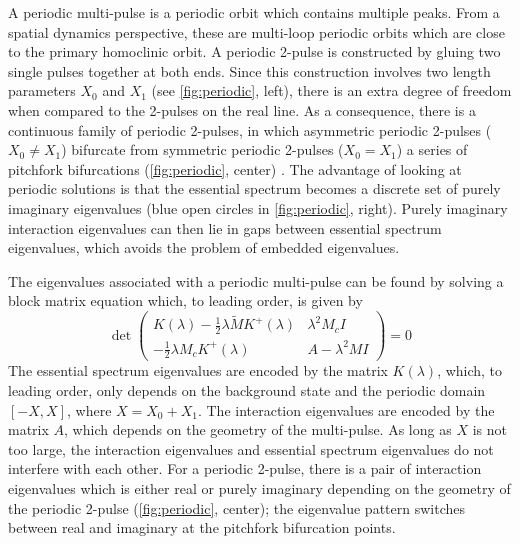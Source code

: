 \documentclass[12pt,reqno,oneside]{article}
\theoremstyle{definition}
\theoremstyle{remark}
\begin{document}
A periodic multi-pulse is a periodic orbit which contains multiple peaks. From a spatial dynamics perspective, these are multi-loop periodic orbits which are close to the primary homoclinic orbit. A periodic 2-pulse is constructed by gluing two single pulses together at both ends. Since this construction involves two length parameters $X_0$ and $X_1$ (see \cref{fig:periodic}, left), there is an extra degree of freedom when compared to the 2-pulses on the real line. As a consequence, there is a continuous family of periodic 2-pulses, in which asymmetric periodic 2-pulses ($X_0 \neq X_1$) bifurcate from symmetric periodic 2-pulses ($X_0 = X_1$) a series of pitchfork bifurcations (\cref{fig:periodic}, center) \cite{ParkerKdV}. The advantage of looking at periodic solutions is that the essential spectrum becomes a discrete set of purely imaginary eigenvalues (blue open circles in \cref{fig:periodic}, right). Purely imaginary interaction eigenvalues can then lie in gaps between essential spectrum eigenvalues, which avoids the problem of embedded eigenvalues. 

The eigenvalues associated with a periodic multi-pulse can be found by solving a block matrix equation which, to leading order, is given by
\begin{equation}\label{blockmatrix}
\det \begin{pmatrix}
K(\lambda) - \frac{1}{2} \lambda \tilde{M} K^+(\lambda) & \lambda^2 M_c I \\
-\frac{1}{2} \lambda M_c K^+(\lambda) & A - \lambda^2 MI  
\end{pmatrix} = 0
\end{equation}
The essential spectrum eigenvalues are encoded by the matrix $K(\lambda)$, which, to leading order, only depends on the background state and the periodic domain $[-X, X]$, where $X = X_0 + X_1$. The interaction eigenvalues are encoded by the matrix $A$, which depends on the geometry of the multi-pulse. As long as $X$ is not too large, the interaction eigenvalues and essential spectrum eigenvalues do not interfere with each other. For a periodic 2-pulse, there is a pair of interaction eigenvalues which is either real or purely imaginary depending on the geometry of the periodic 2-pulse (\cref{fig:periodic}, center); the eigenvalue pattern switches between real and imaginary at the pitchfork bifurcation points.  
\end{document}
